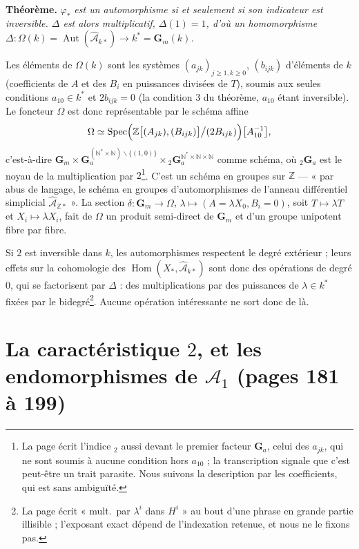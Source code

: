 \documentclass[11pt,a4paper]{article}
\begin{document}
\textbf{Théorème.} \emph{$\varphi_*$ est un automorphisme si et seulement si
son indicateur est inversible. $\Delta$ est alors multiplicatif, $\Delta(1) =
1$, d'où un homomorphisme $\Delta : \Omega(k) =
\operatorname{Aut}(\widehat{\mathcal{A}}_{k*}) \to k^* = \mathbf{G}_m(k)$.}

Les éléments de $\Omega(k)$ sont les systèmes $(a_{jk})_{j \geq 1, k \geq 0}$,
$(b_{ijk})$ d'éléments de $k$ (coefficients de $A$ et des $B_i$ en puissances
divisées de $T$), soumis aux seules conditions $a_{10} \in k^*$ et $2b_{ijk} =
0$ (la condition 3 du théorème, $a_{10}$ étant inversible). Le foncteur
$\Omega$ est donc représentable par le schéma affine
\[
\Omega \simeq \operatorname{Spec}\Bigl(\mathbb{Z}\bigl[(A_{jk}), (B_{ijk})\bigr] \big/ (2B_{ijk})\Bigr)\bigl[A_{10}^{-1}\bigr] ,
\]
c'est-à-dire $\mathbf{G}_m \times \mathbf{G}_a^{(\mathbb{N}^* \times
\mathbb{N}) \smallsetminus \{(1,0)\}} \times {}_2\mathbf{G}_a^{\mathbb{N}^* \times
\mathbb{N} \times \mathbb{N}}$ comme schéma, où ${}_2\mathbf{G}_a$ est le noyau de
la multiplication par $2$\footnote{La page écrit l'indice ${}_2$ aussi devant le
premier facteur $\mathbf{G}_a$, celui des $a_{jk}$, qui ne sont soumis à aucune
condition hors $a_{10}$ ; la transcription signale que c'est peut-être un
trait parasite. Nous suivons la description par les coefficients, qui est sans
ambiguïté.}. C'est un schéma en groupes sur $\mathbb{Z}$ — « par abus de
langage, le schéma en groupes d'automorphismes de l'anneau différentiel
simplicial $\widehat{\mathcal{A}}_{\mathbb{Z}*}$ ». La section $\delta :
\mathbf{G}_m \to \Omega$, $\lambda \mapsto (A = \lambda X_0, B_i = 0)$, soit
$T \mapsto \lambda T$ et $X_i \mapsto \lambda X_i$, fait de $\Omega$ un produit
semi-direct de $\mathbf{G}_m$ et d'un groupe unipotent fibre par fibre.

Si $2$ est inversible dans $k$, les automorphismes respectent le degré
extérieur ; leurs effets sur la cohomologie des $\operatorname{Hom}(X_*,
\widehat{\mathcal{A}}_{k*})$ sont donc des opérations de degré $0$, qui se
factorisent par $\Delta$ : des multiplications par des puissances de $\lambda
\in k^*$ fixées par le bidegré\footnote{La page écrit « mult.\ par $\lambda^i$
dans $H^i$ » au bout d'une phrase en grande partie illisible ; l'exposant exact
dépend de l'indexation retenue, et nous ne le fixons pas.}. Aucune opération
intéressante ne sort donc de là.

\section*{La caractéristique $2$, et les endomorphismes de $\mathcal{A}_1$ (pages 181 à 199)}
\end{document}
